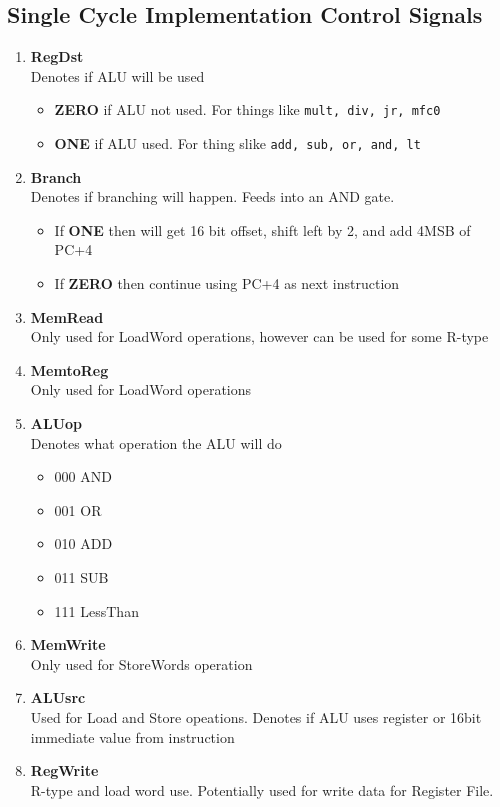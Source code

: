 \documentclass{article}
\newcommand\tab[1][0.5cm]{\hspace*{#1}}
\begin{document}
	\subsection{Single Cycle Implementation Control Signals}
		\begin{enumerate}
			\item \textbf{RegDst}
				\\Denotes if ALU will be used
				\begin{itemize}
					\item \textbf{ZERO} if ALU not used. For things like \texttt{mult, div, jr, mfc0}
					\item \textbf{ONE} if ALU used. For thing slike \texttt{add, sub, or, and, lt}
				\end{itemize}

			\item \textbf{Branch}
				\\Denotes if branching will happen. Feeds into an AND gate.
				\begin{itemize}
					\item If \textbf{ONE} then will get 16 bit offset, shift left by 2, and add 4MSB of PC+4
					\item If \textbf{ZERO} then continue using PC+4 as next instruction
				\end{itemize}

			\item \textbf{MemRead}
				\\Only used for LoadWord operations, however can be used for some R-type

			\item \textbf{MemtoReg}
				\\Only used for LoadWord operations

			\item \textbf{ALUop}
				\\Denotes what operation the ALU will do
				\begin{itemize}
					\item 000 \tab AND
					\item 001 \tab OR
					\item 010 \tab ADD
					\item 011 \tab SUB
					\item 111 \tab LessThan
				\end{itemize}

			\item \textbf{MemWrite}
				\\Only used for StoreWords operation

			\item \textbf{ALUsrc}
				\\Used for Load and Store opeations. Denotes if ALU uses register or 16bit immediate value from instruction

			\item \textbf{RegWrite}
				\\R-type and load word use. Potentially used for write data for Register File.
		\end{enumerate}
\end{document}
